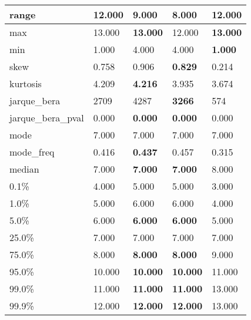 \begin{table}[H]
\begin{tabular}{|l|m{10em}|m{10em}|m{10em}|m{10em}|}
\hline range & 12.000 & 9.000 & \cellcolor[rgb]{0.9, 0.54, 0.52} 8.000 & \bfseries 12.000 \\
\hline max & 13.000 & \bfseries 13.000 & \cellcolor[rgb]{0.9, 0.54, 0.52} 12.000 & \bfseries 13.000 \\
\hline min & 1.000 & \cellcolor[rgb]{0.9, 0.54, 0.52} 4.000 & \cellcolor[rgb]{0.9, 0.54, 0.52} 4.000 & \bfseries 1.000 \\
\hline skew & 0.758 & 0.906 & \bfseries 0.829 & \cellcolor[rgb]{0.9, 0.54, 0.52} 0.214 \\
\hline kurtosis & 4.209 & \bfseries 4.216 & 3.935 & \cellcolor[rgb]{0.9, 0.54, 0.52} 3.674 \\
\hline jarque\_bera & 2709 & 4287 & \bfseries 3266 & \cellcolor[rgb]{0.9, 0.54, 0.52} 574 \\
\hline jarque\_bera\_pval & 0.000 & \bfseries 0.000 & \bfseries 0.000 & \cellcolor[rgb]{0.9, 0.54, 0.52} 0.000 \\
\hline mode & 7.000 & 7.000 & 7.000 & 7.000 \\
\hline mode\_freq & 0.416 & \bfseries 0.437 & 0.457 & \cellcolor[rgb]{0.9, 0.54, 0.52} 0.315 \\
\hline median & 7.000 & \bfseries 7.000 & \bfseries 7.000 & \cellcolor[rgb]{0.9, 0.54, 0.52} 8.000 \\
\hline 0.1\% & 4.000 & 5.000 & 5.000 & 3.000 \\
\hline 1.0\% & 5.000 & 6.000 & 6.000 & 4.000 \\
\hline 5.0\% & 6.000 & \bfseries 6.000 & \bfseries 6.000 & \cellcolor[rgb]{0.9, 0.54, 0.52} 5.000 \\
\hline 25.0\% & 7.000 & 7.000 & 7.000 & 7.000 \\
\hline 75.0\% & 8.000 & \bfseries 8.000 & \bfseries 8.000 & \cellcolor[rgb]{0.9, 0.54, 0.52} 9.000 \\
\hline 95.0\% & 10.000 & \bfseries 10.000 & \bfseries 10.000 & \cellcolor[rgb]{0.9, 0.54, 0.52} 11.000 \\
\hline 99.0\% & 11.000 & \bfseries 11.000 & \bfseries 11.000 & \cellcolor[rgb]{0.9, 0.54, 0.52} 13.000 \\
\hline 99.9\% & 12.000 & \bfseries 12.000 & \bfseries 12.000 & \cellcolor[rgb]{0.9, 0.54, 0.52} 13.000 \\
\hline
\end{tabular}
\end{table}

